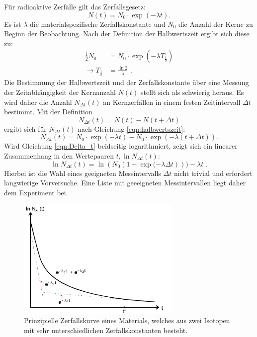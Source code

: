 Für radioaktive Zerfälle gilt das Zerfallsgesetz:
\begin{equation}
  N(t)=N_0 \cdot \exp{(-\lambda t)} \text{.}
\end{equation}
Es ist $\lambda$ die materialspezifische Zerfallskonstante und $N_0$ die Anzahl der Kerne zu Beginn der Beobachtung.
Nach der Definition der Halbwertszeit ergibt sich diese zu:
\begin{align}
  \label{eqn:halbwertszeit}
  \frac{1}{2} N_0&= N_0 \cdot \exp{(-\lambda T_\frac{1}{2})}\\
  \rightarrow T_{\frac{1}{2}}&=\frac{\ln{2}}{\lambda} \text{ .}
\end{align}
Die Bestimmung der Halbwertszeit und der Zerfallskonstante über eine Messung der Zeitabhängigkeit der Kernanzahl $N(t)$ stellt sich als schwierig heraus.
Es wird daher die Anzahl $N_{\Delta t}(t)$ an Kernzerfällen in einem festen Zeitintervall $\Delta t$ bestimmt.
Mit der Definition
\begin{equation*}
  N_{\Delta t}(t)=N(t)-N(t+\Delta t)
\end{equation*}
ergibt sich für $N_{\Delta t}(t)$ nach Gleichung \eqref{eqn:halbwertszeit}:
\begin{equation}
  \label{eqn:Delta_t}
  N_{\Delta t}(t)=N_0 \cdot \exp{(-\lambda t)}-N_0 \cdot \exp{(-\lambda(t+\Delta t))} \text{.}
\end{equation}
Wird Gleichung \eqref{eqn:Delta_t} beidseitig logarithmiert, zeigt sich ein linearer Zusammenhang in den Wertepaaren ${t, \ln{N_{\Delta t}(t)}}$:
\begin{equation}
  \label{eqn:ausgleichsrechnung}
  \ln{  N_{\Delta t}(t)}=\ln{(N_0 \left(1- \exp{(-\lambda \Delta t}\right)))}-\lambda t \text{ .}
\end{equation}
Hierbei ist die Wahl eines geeigneten Messintervalls $\Delta t$ nicht trivial und erfordert langwierige Vorversuche. Eine Liste mit geeeigneten Messintervallen liegt daher dem Experiment bei.
\begin{figure}
  \centering
  \includegraphics[width=0.7\textwidth]{Bilder/zerfallskurve.png}
  \caption{Prinzipielle Zerfallskurve eines Materials, welches aus zwei Isotopen mit sehr unterschiedlichen Zerfallskonstanten besteht. \cite{Anleitung}}
  \label{fig:zerfallskurve}
\end{figure}
